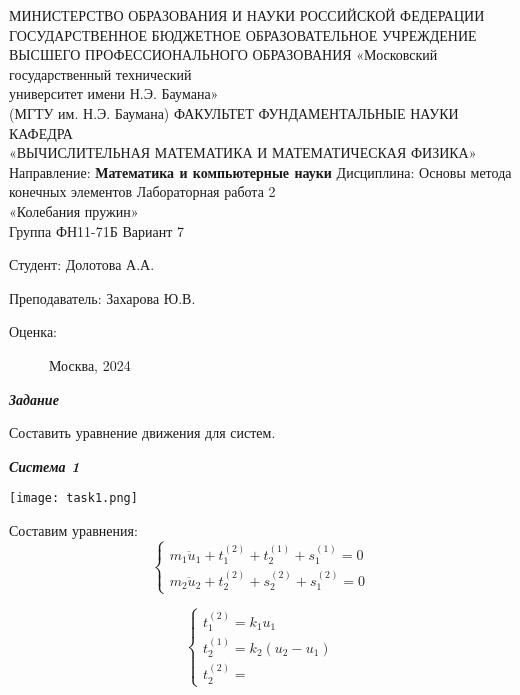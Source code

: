 \documentclass[a4paper, 12pt]{article}
\begin{document}
	\pagestyle{empty}
	\begin{center}
		МИНИСТЕРСТВО ОБРАЗОВАНИЯ И НАУКИ РОССИЙСКОЙ ФЕДЕРАЦИИ \\ ГОСУДАРСТВЕННОЕ БЮДЖЕТНОЕ ОБРАЗОВАТЕЛЬНОЕ УЧРЕЖДЕНИЕ \\ 
		ВЫСШЕГО ПРОФЕССИОНАЛЬНОГО ОБРАЗОВАНИЯ
		\vskip 1.5cm
		«Московский государственный технический \\
		университет имени Н.Э. Баумана» \\
		(МГТУ им. Н.Э. Баумана)
		\vskip 1.5cm
		ФАКУЛЬТЕТ ФУНДАМЕНТАЛЬНЫЕ НАУКИ \\
		КАФЕДРА \\
		«ВЫЧИСЛИТЕЛЬНАЯ МАТЕМАТИКА И МАТЕМАТИЧЕСКАЯ ФИЗИКА»
		\vskip 0.4cm
		Направление: \textbf{Математика и компьютерные науки}
		\vskip 0.4cm
		Дисциплина: Основы метода конечных элементов
		\vskip 0.4cm
		Лабораторная работа 2 \\
		«Колебания пружин» \\
		Группа ФН11-71Б
		\vskip 0.2cm
		Вариант 7
		
		
		\vskip 1.5cm
		\begin{flushright}
			Студент: Долотова А.А.
			
			\vskip 1.5cm
			
			Преподаватель: Захарова Ю.В.
		\end{flushright}
		Оценка:
		
		\begin{figure}[b]
			\begin{center}
				Москва, 2024
			\end{center}
		\end{figure}
		
	\end{center}
	
	\newpage
	\pagestyle{plain}

\begin{center}
\textbf{\textit{Задание}}
\end{center}

Составить уравнение движения для систем. 

\begin{center}
\textbf{\textit{Система 1}}
\end{center}

\texttt{[image: task1.png]}

Составим уравнения:
\[\begin{cases}
m_1\ddot u_1 + t_1^{(2)} + t_2^{(1)} + s_1^{(1)} = 0 \\
m_2\ddot u_2 + t_2^{(2)} + s_2^{(2)} + s_1^{(2)} = 0
\end{cases}\]

\[\begin{cases}
t_1^{(2)} = k_1 u_1\\
t_2^{(1)} = k_2 (u_2 - u_1)\\
t_2^{(2)} = 
\end{cases}\]
\end{document}

